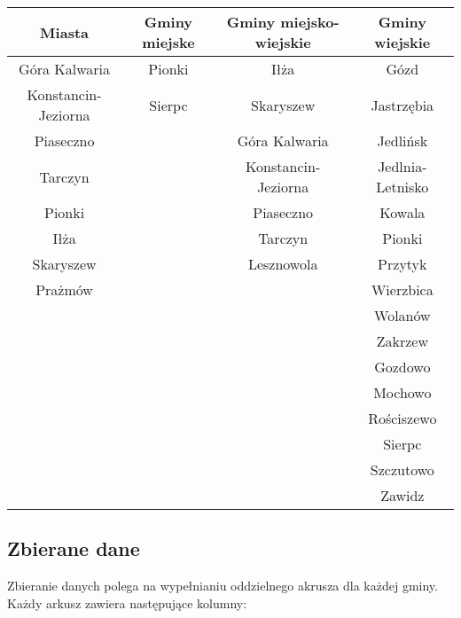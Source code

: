 \documentclass[a4 122pt]{article}
\begin{document}
			\vspace{0.5cm}
			\begin{center}
			\begin{tabular}{cccc}
				\centering
				
				\textbf{Miasta} & \textbf{Gminy miejske} & \textbf{Gminy miejsko-wiejskie} & \textbf{Gminy wiejskie} \\ \hline
				Góra Kalwaria		 	& 	Pionki 	& Iłża 				& Gózd \\\hline
				Konstancin-Jeziorna 	&	Sierpc	& Skaryszew			& Jastrzębia\\\hline
				Piaseczno				&			& Góra Kalwaria		& Jedlińsk\\\hline
				Tarczyn					&			& Konstancin-Jeziorna & Jedlnia-Letnisko\\\hline
				Pionki					&			& Piaseczno				& Kowala\\\hline
				Iłża					&			& Tarczyn			&	Pionki	\\\hline
				Skaryszew				&			&	Lesznowola		&	Przytyk \\\hline
				Prażmów					&			&					& Wierzbica\\\hline
																	& & & Wolanów\\ \hline
																	& & & Zakrzew\\\hline
																	& & & Gozdowo\\\hline
																	& & & Mochowo\\\hline
																	& & & Rościszewo\\\hline
																	& & & Sierpc\\\hline
																	& & & Szczutowo\\\hline
																	& & & Zawidz\\
			\end{tabular}
			\end{center}
	
		\subsection{Zbierane dane}

			Zbieranie danych polega na wypełnianiu oddzielnego akrusza dla każdej gminy.
			Każdy arkusz zawiera następujące kolumny:
			
\end{document}
